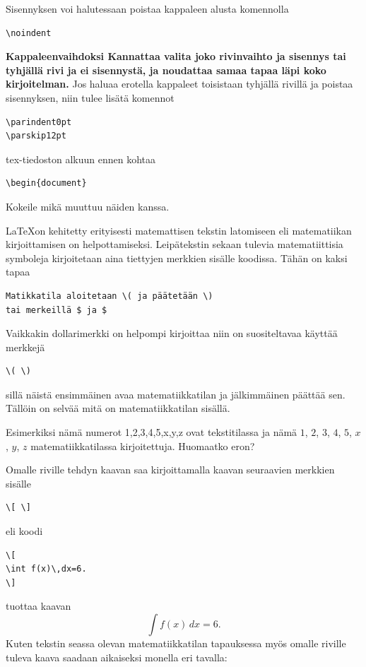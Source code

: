 \documentclass[a4paper,12 pt]{article}
\theoremstyle{plain}
\theoremstyle{definition}
\theoremstyle{remark}
\numberwithin{equation}{section}
\numberwithin{figure}{section}
\begin{document}
\indent Sisennyksen voi halutessaan poistaa kappaleen alusta komennolla

\begin{verbatim}
\noindent
\end{verbatim}

\textbf{Kappaleenvaihdoksi Kannattaa valita joko rivinvaihto ja sisennys tai tyhjällä rivi ja ei sisennystä, ja noudattaa samaa tapaa läpi koko kirjoitelman.} Jos haluaa erotella kappaleet toisistaan tyhjällä rivillä ja poistaa sisennyksen, niin tulee lisätä komennot

\begin{verbatim}
\parindent0pt
\parskip12pt
\end{verbatim}
tex-tiedoston alkuun ennen kohtaa

\begin{verbatim}
\begin{document}
\end{verbatim}
Kokeile mikä muuttuu näiden kanssa.

\LaTeX on kehitetty erityisesti matemattisen tekstin latomiseen eli matematiikan kirjoittamisen on helpottamiseksi. Leipätekstin sekaan tulevia matematiittisia symboleja kirjoitetaan aina tiettyjen merkkien sisälle koodissa. Tähän on kaksi tapaa

\begin{verbatim}
Matikkatila aloitetaan \( ja päätetään \)
tai merkeillä $ ja $ 
\end{verbatim}
Vaikkakin dollarimerkki on helpompi kirjoittaa niin on suositeltavaa käyttää merkkejä

\begin{verbatim}
\( \)    
\end{verbatim}
sillä näistä ensimmäinen avaa matematiikkatilan ja jälkimmäinen päättää sen. Tällöin on selvää mitä on matematiikkatilan sisällä.

Esimerkiksi nämä numerot  1,2,3,4,5,x,y,z ovat tekstitilassa ja nämä $1$, $2$, $3$, $4$, $5$, $x$, $y$, $z$ matematiikkatilassa kirjoitettuja. Huomaatko eron? 

Omalle riville tehdyn kaavan saa kirjoittamalla kaavan seuraavien merkkien sisälle

\begin{verbatim}
\[ \]    
\end{verbatim}
eli koodi

\begin{verbatim}
\[
\int f(x)\,dx=6.
\]    
\end{verbatim}
tuottaa kaavan
\[
\int f(x)\,dx=6.
\]    
Kuten tekstin seassa olevan matematiikkatilan tapauksessa myös omalle riville tuleva kaava saadaan aikaiseksi monella eri tavalla:
\end{document}
